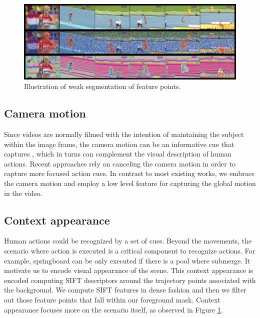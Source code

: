\begin{figure}[t!]
\begin{center}
\includegraphics[width=0.98\linewidth]{fig/approach.png}
\end{center}
\caption{Illustration of weak segmentation of feature points. }
\label{fig:approach}
\end{figure}

\subsection{Camera motion}
Since videos are normally filmed with the intention of maintaining the subject within the image frame, the camera motion can be an informative cue that captures , which in turns can complement the visual description of human actions. Recent approaches rely on canceling the camera motion in order to capture more focused action cues. In contrast to most existing works, we embrace the camera motion and employ a low level feature for capturing the global motion in the video.
\subsection{Context appearance}
Human actions could be recognized by a set of cues. Beyond the movements, the scenario where action is executed is a critical component to recognize actions. For example, springboard can be only executed if there is a pool where submerge. It motivate us to encode visual appearance of the scene. This context appearance is encoded computing SIFT \cite{lowe2004} descriptors around the trajectory points associated with the background. We compute SIFT features in dense fashion and then we filter out those feature points that fall within our foreground mask. Context appearance focuses more on the scenario itself, as observed in Figure \ref{fig:approach}. 
